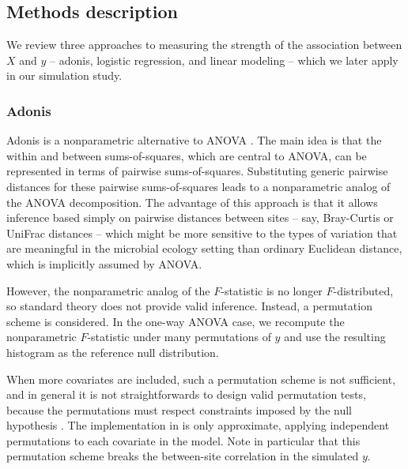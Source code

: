 \documentclass{article}
\begin{document}
\subsection{Methods description}
\label{subsec:methods_description}

We review three approaches to measuring the strength of the association between
$X$ and $y$ -- adonis, logistic regression, and linear modeling -- which we
later apply in our simulation study.

\subsubsection{Adonis}
\label{subsubsec:adonis}

Adonis is a nonparametric alternative to ANOVA \citep{anderson2001new}. The main
idea is that the within and between sums-of-squares, which are central to ANOVA,
can be represented in terms of pairwise sums-of-squares. Substituting generic
pairwise distances for these pairwise sums-of-squares leads to a nonparametric
analog of the ANOVA decomposition. The advantage of this approach is that it
allows inference based simply on pairwise distances between sites -- say,
Bray-Curtis or UniFrac distances -- which might be more sensitive to the types
of variation that are meaningful in the microbial ecology setting than ordinary
Euclidean distance, which is implicitly assumed by ANOVA.

However, the nonparametric analog of the $F$-statistic is no longer
$F$-distributed, so standard theory does not provide valid inference. Instead, a
permutation scheme is considered. In the one-way ANOVA case, we recompute the
nonparametric $F$-statistic under many permutations of $y$ and use the resulting
histogram as the reference null distribution.

When more covariates are included, such a permutation scheme is not sufficient,
and in general it is not straightforwards to design valid permutation tests,
because the permutations must respect constraints imposed by the null hypothesis
\cite{anderson2001new}. The implementation in \citep{oksanen2007vegan} is only
approximate, applying independent permutations to each covariate in the model.
Note in particular that this permutation scheme breaks the between-site
correlation in the simulated $y$.

\end{document}
